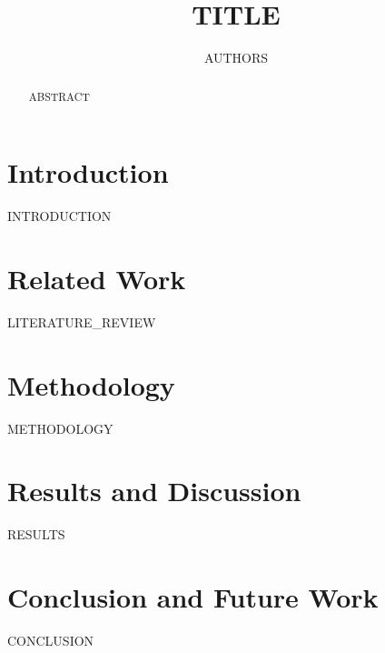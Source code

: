 \documentclass[runningheads]{llncs}
\begin{document}
\title{{{TITLE}}}

\author{{{AUTHORS}}}



\maketitle

\begin{abstract}
{{ABSTRACT}}
\end{abstract}

\section{Introduction}
{{INTRODUCTION}}

\section{Related Work}
{{LITERATURE_REVIEW}}

\section{Methodology}
{{METHODOLOGY}}

\section{Results and Discussion}
{{RESULTS}}

\section{Conclusion and Future Work}
{{CONCLUSION}}



\end{document}
